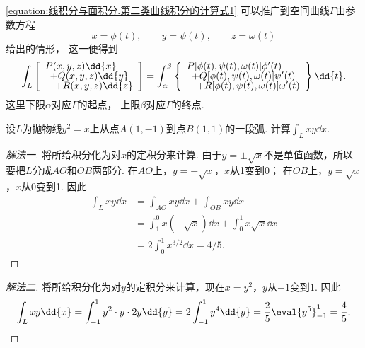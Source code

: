 \cref{equation:线积分与面积分.第二类曲线积分的计算式1} 可以推广到空间曲线\(\Gamma\)由参数方程\begin{equation*}
	x=\phi(t), \qquad
	y=\psi(t), \qquad
	z=\omega(t)
\end{equation*}给出的情形，
这一便得到
\begin{equation}\label{equation:线积分与面积分.第二类曲线积分的计算式2}
	\int_L \left[ \def\arraystretch{.7}\begin{array}{l}
		P(x,y,z)\dd{x} \\
		\hspace{5pt}+ Q(x,y,z)\dd{y} \\
		\hspace{10pt}+ R(x,y,z)\dd{z}
	\end{array} \right]
	= \int_\alpha^\beta \left\{\def\arraystretch{.7}\begin{array}{l}
	P[\phi(t),\psi(t),\omega(t)] \phi'(t) \\
	\hspace{5pt}+ Q[\phi(t),\psi(t),\omega(t)] \psi'(t) \\
	\hspace{10pt}+ R[\phi(t),\psi(t),\omega(t)] \omega'(t)
	\end{array} \right\} \dd{t}.
\end{equation}
这里下限\(\alpha\)对应\(\Gamma\)的起点，
上限\(\beta\)对应\(\Gamma\)的终点.

\begin{example}
设\(L\)为抛物线\(y^2 = x\)上从点\(A(1,-1)\)到点\(B(1,1)\)的一段弧.
计算\(\int_L xy \dd{x}\).
\begin{solution}\let\qed\relax
\begin{proof}[解法一]
将所给积分化为对\(x\)的定积分来计算.
由于\(y = \pm\sqrt{x}\)不是单值函数，所以要把\(L\)分成\(AO\)和\(OB\)两部分.
在\(AO\)上，\(y=-\sqrt{x}\)，\(x\)从1变到0；
在\(OB\)上，\(y=\sqrt{x}\)，\(x\)从0变到1.
因此\begin{align*}
	\int_L xy \dd{x} &= \int_{AO} xy \dd{x} + \int_{OB} xy \dd{x} \\
	&= \int_1^0 x(-\sqrt{x}) \dd{x} + \int_0^1 x\sqrt{x} \dd{x} \\
	&= 2\int_0^1 x^{3/2} \dd{x} = 4/5.
\end{align*}
\end{proof}
\begin{proof}[解法二]
将所给积分化为对\(y\)的定积分来计算，现在\(x=y^2\)，\(y\)从\(-1\)变到\(1\).
因此\begin{equation*}
	\int_L xy \dd{x}
	= \int_{-1}^1 y^2 \cdot y \cdot 2y \dd{y}
	= 2\int_{-1}^1 y^4 \dd{y}
	= \frac{2}{5} \eval{y^5}_{-1}^1
	= \frac{4}{5}.
\end{equation*}
\end{proof}
\end{solution}
\end{example}

